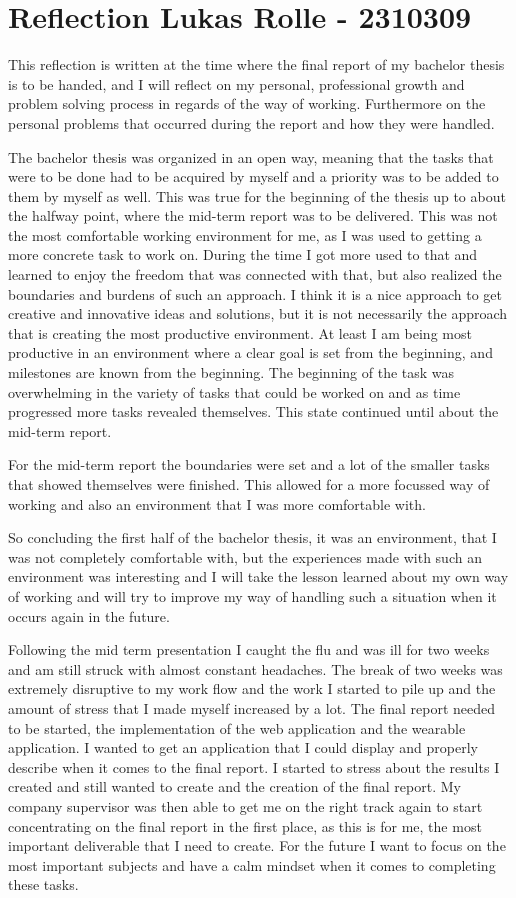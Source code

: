 \documentclass[a4paper]{report}
\begin{document}
\chapter*{Reflection \normalsize{Lukas Rolle - 2310309}}
This reflection is written at the time where the final report of my bachelor thesis is to be handed, and I will reflect on my personal, professional growth and problem solving process in regards of the way of working. Furthermore on the personal problems that occurred during the report and how they were handled.

The bachelor thesis was organized in an open way, meaning that the tasks that were to be done had to be acquired by myself and a priority was to be added to them by myself as well. This was true for the beginning of the thesis up to about the halfway point, where the mid-term report was to be delivered. This was not the most comfortable working environment for me, as I was used to getting a more concrete task to work on. During the time I got more used to that and learned to enjoy the freedom that was connected with that, but also realized the boundaries and burdens of such an approach. I think it is a nice approach to get creative and innovative ideas and solutions, but it is not necessarily the approach that is creating the most productive environment. At least I am being most productive in an environment where a clear goal is set from the beginning, and milestones are known from the beginning. The beginning of the task was overwhelming in the variety of tasks that could be worked on and as time progressed more tasks revealed themselves. This state continued until about the mid-term report. 

For the mid-term report the boundaries were set and a lot of the smaller tasks that showed themselves were finished. This allowed for a more focussed way of working and also an environment that I was more comfortable with.

So concluding the first half of the bachelor thesis, it was an environment, that I was not completely comfortable with, but the experiences made with such an environment was interesting and I will take the lesson learned about my own way of working and will try to improve my way of handling such a situation when it occurs again in the future.

Following the mid term presentation I caught the flu and was ill for two weeks and am still struck with almost constant headaches. The break of two weeks was extremely disruptive to my work flow and the work I started to pile up and the amount of stress that I made myself increased by a lot. The final report needed to be started, the implementation of the web application and the wearable application. I wanted to get an application that I could display and properly describe when it comes to the final report. I started to stress about the results I created and still wanted to create and the creation of the final report. My company supervisor was then able to get me on the right track again to start concentrating on the final report in the first place, as this is for me, the most important deliverable that I need to create. For the future I want to focus on the most important subjects and have a calm mindset when it comes to completing these tasks.
\end{document}
